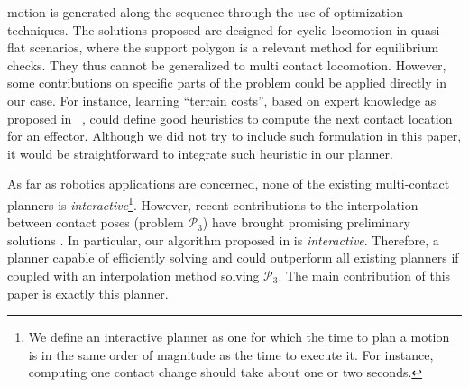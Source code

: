 \documentclass[journal]{IEEEtran}
\newcommand{\gls}[1]{\textit{#1}}
\providecommand{\DIFaddtex}[1]{#1} %
\providecommand{\DIFaddbegin}{\protect\color{blue}} %
\providecommand{\DIFaddend}{\protect\color{black}} %
\providecommand{\DIFadd}[1]{\texorpdfstring{\DIFaddtex{#1}}{#1}} %
\begin{document}
{motion is generated along the sequence through the use of optimization techniques. 
The solutions proposed are designed for cyclic locomotion in quasi-flat scenarios, where the support polygon is a relevant method for equilibrium checks. They thus cannot be generalized to multi contact locomotion. 
However, some contributions on specific parts of the problem could be applied directly in our case. 
For instance, learning ``terrain costs'', based on expert knowledge as proposed in ~\cite{Ratliff:2009:LSF:1569248.1569253}, could define good heuristics to compute the next contact location for an effector. Although we did not try to include such formulation in this paper, it would be straightforward to integrate such heuristic in our planner.
}\DIFaddend 


As far as robotics applications are concerned, none of the existing \DIFaddbegin \DIFadd{multi-contact }\DIFaddend planners is \gls{interactive}\DIFaddbegin \footnote{\DIFadd{We define an interactive planner as one for which the time to plan a motion is in the same order of magnitude as the time to execute it. For instance, computing one contact change should take about one or two seconds.}}\DIFaddend .
However, recent contributions to the interpolation between contact poses (problem $\mathcal{P}_3$) have brought promising preliminary solutions \citep{Hauser2014, herzog2015trajectory, Park116, Carpentier2016}. In particular, our algorithm proposed in \cite{Carpentier2016} is \gls{interactive}.
Therefore, a planner capable of efficiently solving \Pa and \Pb could outperform all existing planners if coupled with an interpolation method solving $\mathcal{P}_3$.
The main contribution of this paper is exactly this planner.
\end{document}
